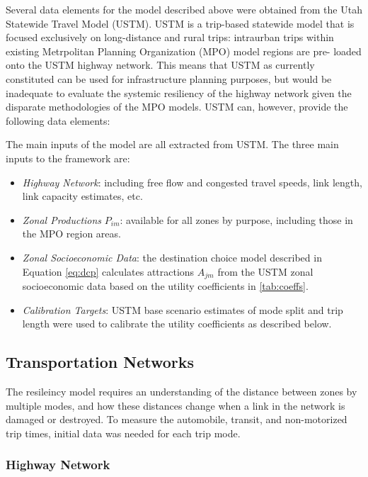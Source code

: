 Several data elements for the model described above were obtained from the
Utah
Statewide Travel Model (USTM). USTM is a trip-based statewide model that is
focused exclusively on long-distance and rural trips: intraurban trips
within
existing Metrpolitan Planning Organization (MPO) model regions are pre-
loaded
onto the USTM highway network. This means that USTM as currently
constituted can
be used for infrastructure planning purposes, but would be inadequate to
evaluate the systemic resiliency of the highway network given the disparate
methodologies of the MPO models. USTM can, however, provide the following
data elements:

The main inputs of the model are all extracted from USTM. The three main
inputs to the framework are:

\begin{itemize}
\def\labelenumi{\arabic{enumi}.}
\item
  \emph{Highway Network}: including free flow and congested travel speeds,
  link length, link capacity estimates, etc.
\item
  \emph{Zonal Productions} \(P_{im}\): available for all zones by purpose,
  including those in the MPO region areas.
\item
  \emph{Zonal Socioeconomic Data}: the destination choice model described in
  Equation \eqref{eq:dcp} calculates attractions \(A_{jm}\) from the USTM zonal
  socioeconomic data based on the utility coefficients in \ref{tab:coeffs}.
\item
  \emph{Calibration Targets}: USTM base scenario estimates of mode split and
  trip length were used to calibrate the utility coefficients as described
  below.
\end{itemize}


\subsection{Transportation Networks}

The resileincy model requires an understanding of the distance between zones by multiple modes, and how
these distances change when a link in the network is damaged or destroyed. To measure the
automobile, transit, and non-motorized trip times, initial data was needed for each trip mode.

\subsubsection{Highway Network}

